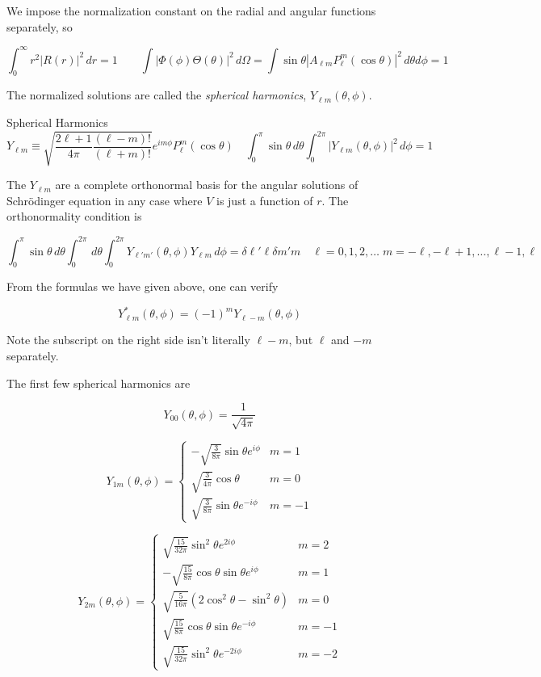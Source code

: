 We impose the normalization constant on the radial and angular functions
separately, so 

\[
\int_{0}^{\infty} r^2|R(r)|^2 \, dr = 1 \qquad \int |\Phi(\phi)\Theta(\theta)
|^2 \, d\Omega = \int \sin\theta |A_{\ell m} P_\ell^{m}(\cos \theta)|^2 \,
d\theta d\phi =1
\] \vspace{3px}

The normalized solutions are called the \textit{spherical harmonics}, $Y_{\ell
m}(\theta, \phi)$. 

\begin{mainbox}{Spherical Harmonics}
  \[
  Y_{\ell m} \equiv \sqrt{\frac{2\ell+1}{4\pi} \frac{(\ell - m)!}{(\ell+m)!}}
  e^{im\phi} P_\ell^m (\cos\theta) \quad \int_{0}^{\pi} \sin\theta \, d\theta
  \int_{0}^{2\pi} |Y_{\ell m}(\theta, \phi)|^2 \, d\phi = 1
  \] 
\end{mainbox}

The $Y_{\ell m}$ are a complete orthonormal basis for the angular solutions of
Schr\"odinger equation in any case where $V$ is just a function of  $r$. The
orthonormality condition is 

\[
\int_{0}^{\pi} \sin\theta \, d\theta \int_{0}^{2\pi}  \, d\theta
\int_{0}^{2\pi} Y_{\ell' m'} (\theta,\phi) Y_{\ell m} \, d\phi = \delta{\ell'
\ell } \delta{m'm} \quad \ell = 0,1,2,\hdots \; m = -\ell, -\ell +1, \hdots,
\ell -1, \ell  
\] \vspace{3px}

From the formulas we have given above, one can verify 

\[
  Y_{\ell m}^* (\theta,\phi) = (-1)^{m} Y_{\ell -m} (\theta,\phi)
\] \vspace{3px}

Note the subscript on the right side isn't literally $\ell - m$, but $\ell
$ and $-m$ separately. 

The first few spherical harmonics are 

\[
Y_{00}(\theta, \phi) = \frac{1}{\sqrt{4\pi}}
\]

\[
Y_{1m}(\theta, \phi) = 
\begin{cases} 
-\sqrt{\frac{3}{8\pi}} \sin \theta e^{i\phi} & m = 1 \\
\sqrt{\frac{3}{4\pi}} \cos \theta & m = 0 \\
\sqrt{\frac{3}{8\pi}} \sin \theta e^{-i\phi} & m = -1
\end{cases}
\]

\[
Y_{2m}(\theta, \phi) = 
\begin{cases} 
\sqrt{\frac{15}{32\pi}} \sin^2 \theta e^{2i\phi} & m = 2 \\
-\sqrt{\frac{15}{8\pi}} \cos \theta \sin \theta e^{i\phi} & m = 1 \\
\sqrt{\frac{5}{16\pi}} (2\cos^2 \theta - \sin^2 \theta) & m = 0 \\
\sqrt{\frac{15}{8\pi}} \cos \theta \sin \theta e^{-i\phi} & m = -1 \\
\sqrt{\frac{15}{32\pi}} \sin^2 \theta e^{-2i\phi} & m = -2
\end{cases}
\]

